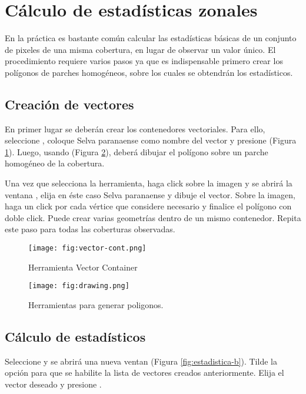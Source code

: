 \section{Cálculo de estadísticas zonales}

En la práctica es bastante común calcular las estadísticas básicas de un conjunto de pixeles de una misma cobertura, en lugar de observar un valor único. El procedimiento requiere varios pasos ya que es indispensable primero crear los polígonos de parches homogéneos, sobre los cuales se obtendrán los estadísticos.
\subsection{Creación de vectores}

	En primer lugar se deberán crear los contenedores vectoriales. Para ello, seleccione , coloque Selva paranaense como nombre del vector y presione  (Figura \ref{fig:vector-container}). Luego, usando   (Figura \ref{fig:drawing}), deberá dibujar el polígono sobre un parche homogéneo de la cobertura.

  Una vez que selecciona la herramienta, haga click sobre la imagen y se abrirá la ventana , elija en éste caso Selva paranaense y dibuje el vector. Sobre la imagen, haga un click por cada vértice que considere necesario y finalice el polígono con doble click. Puede crear varias geometrías dentro de un mismo contenedor. Repita este paso para todas las coberturas observadas.

  \begin{figure}[h!]
      \centering
      \texttt{[image: fig:vector-cont.png]}
      \caption{Herramienta Vector Container}
      \label{fig:vector-container}
  \end{figure}


  \begin{figure}[H]
      \centering
      \texttt{[image: fig:drawing.png]}
      \caption{Herramientas para generar poligonos.}
      \label{fig:drawing}
  \end{figure}

\subsection{Cálculo de estadísticos}

	Seleccione  y se abrirá una nueva ventan (Figura \ref{fig:estadistica-b}). Tilde la opción  para que se habilite la lista de vectores creados anteriormente. Elija el vector deseado y presione .


